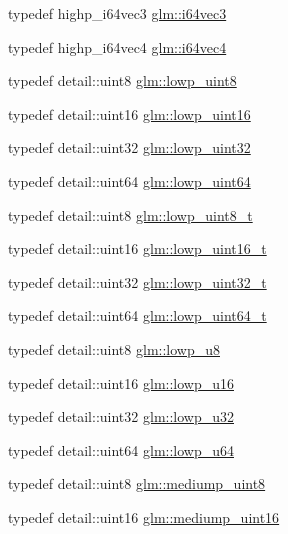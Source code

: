 \begin{DoxyCompactItemize}
typedef highp\-\_\-i64vec3 \hyperlink{group__gtc__type__precision_gab6eefcd7eb24e4142ed23dc1e87163a6}{glm\-::i64vec3}
\item 
typedef highp\-\_\-i64vec4 \hyperlink{group__gtc__type__precision_ga19846034cab6ee6e031884ea30def7fc}{glm\-::i64vec4}
\item 
typedef detail\-::uint8 \hyperlink{group__gtc__type__precision_ga4d9dc08b7b248a386dfe9afd00fc6b1e}{glm\-::lowp\-\_\-uint8}
\item 
typedef detail\-::uint16 \hyperlink{group__gtc__type__precision_ga9b8409887319f62f06e664f6ca121b9d}{glm\-::lowp\-\_\-uint16}
\item 
typedef detail\-::uint32 \hyperlink{group__gtc__type__precision_gaf11e85af414720b4cd12bd57b3a81e68}{glm\-::lowp\-\_\-uint32}
\item 
typedef detail\-::uint64 \hyperlink{group__gtc__type__precision_gacf666a9d9b309c4615c7a4f2ab0be289}{glm\-::lowp\-\_\-uint64}
\item 
typedef detail\-::uint8 \hyperlink{group__gtc__type__precision_ga0910ef24195d1b8b26e34d73148c0c45}{glm\-::lowp\-\_\-uint8\-\_\-t}
\item 
typedef detail\-::uint16 \hyperlink{group__gtc__type__precision_ga9a71176a4e5bc61951f9e9197d9c80e1}{glm\-::lowp\-\_\-uint16\-\_\-t}
\item 
typedef detail\-::uint32 \hyperlink{group__gtc__type__precision_ga9f8cb602a358e1f48bda2682cf051f0c}{glm\-::lowp\-\_\-uint32\-\_\-t}
\item 
typedef detail\-::uint64 \hyperlink{group__gtc__type__precision_gabf3069d4f188557a87b1d7f35eb0a270}{glm\-::lowp\-\_\-uint64\-\_\-t}
\item 
typedef detail\-::uint8 \hyperlink{group__gtc__type__precision_gae63f942c49a30dbf266b2f13f3efe257}{glm\-::lowp\-\_\-u8}
\item 
typedef detail\-::uint16 \hyperlink{group__gtc__type__precision_ga22c5364f27caa0a6eb0627cbc21e46be}{glm\-::lowp\-\_\-u16}
\item 
typedef detail\-::uint32 \hyperlink{group__gtc__type__precision_gaba06fae1dd98ca50c017e68345df0365}{glm\-::lowp\-\_\-u32}
\item 
typedef detail\-::uint64 \hyperlink{group__gtc__type__precision_ga61ed4c68a4cffb77cd63cc107119123a}{glm\-::lowp\-\_\-u64}
\item 
typedef detail\-::uint8 \hyperlink{group__gtc__type__precision_gac4b849eaac0543a10f97f4bdda4850a8}{glm\-::mediump\-\_\-uint8}
\item 
typedef detail\-::uint16 \hyperlink{group__gtc__type__precision_ga2cef3a0d7b0fce75c9885f64656d8933}{glm\-::mediump\-\_\-uint16}

\end{DoxyCompactItemize}
